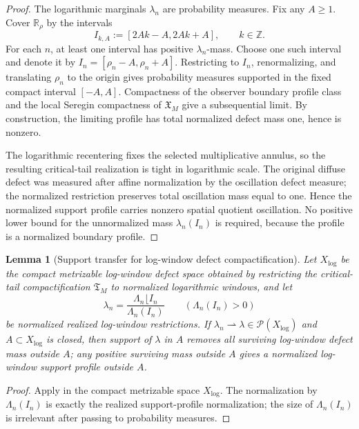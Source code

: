 \documentclass[11pt]{amsart}
\numberwithin{equation}{section}
\theoremstyle{plain}
\newtheorem{lemma}[lemma]{Lemma}
\theoremstyle{definition}
\theoremstyle{remark}
\newcommand{\Tcrit}{\mathfrak T_M}
\begin{document}
\begin{proof}
The logarithmic marginals \(\lambda_n\) are probability measures.  Fix any
\(A\ge1\).  Cover \(\mathbb R_\rho\) by the intervals
\[
   I_{k,A}:=[2Ak-A,2Ak+A],\qquad k\in\mathbb Z .
\]
For each \(n\), at least one interval has positive \(\lambda_n\)-mass.  Choose
one such interval and denote it by \(I_n=[\rho_n-A,\rho_n+A]\).  Restricting to
\(I_n\), renormalizing, and translating \(\rho_n\) to the origin gives
probability measures supported in the fixed compact interval \([-A,A]\).
Compactness of the observer boundary profile class and the local Seregin
compactness of \(\mathfrak X_M\) give a subsequential limit.  By construction,
the limiting profile has total normalized defect mass one, hence is nonzero.

The logarithmic recentering fixes the selected multiplicative annulus, so the
resulting critical-tail realization is tight in logarithmic scale.  The
original diffuse defect was measured after affine normalization by the
oscillation defect measure; the normalized restriction preserves total
oscillation mass equal to one.  Hence the normalized support profile carries nonzero
spatial quotient oscillation.  No positive lower bound for the unnormalized
mass \(\lambda_n(I_n)\) is required, because the profile is a normalized
boundary profile.
\end{proof}

\begin{lemma}[Support transfer for log-window defect compactification]
\label{lem:log-window-support-transfer}
Let \(X_{\log}\) be the compact metrizable log-window defect space obtained by
restricting the critical-tail compactification \(\Tcrit\) to normalized
logarithmic windows, and let
\[
   \lambda_n=\frac{\Lambda_n\lfloor I_n}{\Lambda_n(I_n)}
   \qquad(\Lambda_n(I_n)>0)
\]
be normalized realized log-window restrictions.  If
\(\lambda_n\rightharpoonup\lambda\in\mathcal P(X_{\log})\) and
\(A\subset X_{\log}\) is closed, then support of \(\lambda\) in \(A\) removes
all surviving log-window defect mass outside \(A\); any positive surviving
mass outside \(A\) gives a normalized log-window support profile outside \(A\).
\end{lemma}

\begin{proof}
Apply  in the compact metrizable
space \(X_{\log}\).  The normalization by \(\Lambda_n(I_n)\) is exactly the
realized support-profile normalization; the size of \(\Lambda_n(I_n)\) is
irrelevant after passing to probability measures.
\end{proof}
\end{document}
